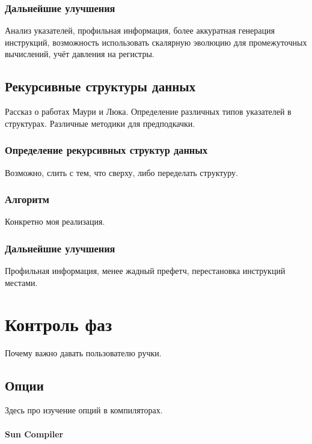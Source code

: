 \documentclass[12pt,a4paper]{article}
\begin{document}
\subsubsection{Дальнейшие улучшения}

Анализ указателей, профильная информация, более аккуратная генерация инструкций, возможность использовать скалярную эволюцию для промежуточных вычислений, учёт давления на регистры.

\subsection{Рекурсивные структуры данных}

Рассказ о работах Маури и Люка. Определение различных типов указателей в структурах. Различные методики для предподкачки.

\subsubsection{Определение рекурсивных структур данных}

Возможно, слить с тем, что сверху, либо переделать структуру.

\subsubsection{Алгоритм}

Конкретно моя реализация.

\subsubsection{Дальнейшие улучшения}

Профильная информация, менее жадный префетч, перестановка инструкций местами.

\section{Контроль фаз}

Почему важно давать пользователю ручки.

\subsection{Опции}

Здесь про изучение опций в компиляторах.

\paragraph{Sun Compiler}
\end{document}

